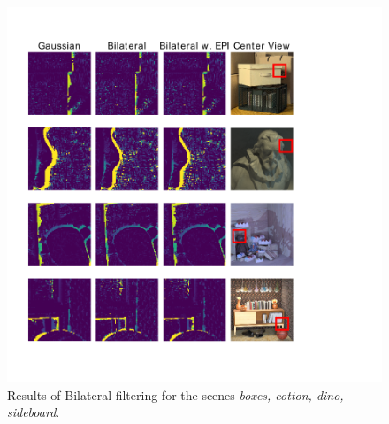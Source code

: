 \documentclass  [
  paper    = a4,
  BCOR     = 10mm,
  twoside,
  fontsize = 12pt,
  fleqn,
  toc      = bibnumbered,
  toc      = listofnumbered,
  numbers  = noendperiod,
  headings = normal,
  listof   = leveldown,
  version  = 3.03
]                                       {scrreprt}
\begin{document}
\begin{figure}[h!]
	\centering
	\includegraphics[width=0.7\linewidth]{images/bilat_results}
	\caption[Results of the bilateral filtering]{Results of Bilateral filtering for the scenes \textit{ boxes, cotton, dino, sideboard}.}
	\label{fig:bilatresults}
\end{figure}
\end{document}
